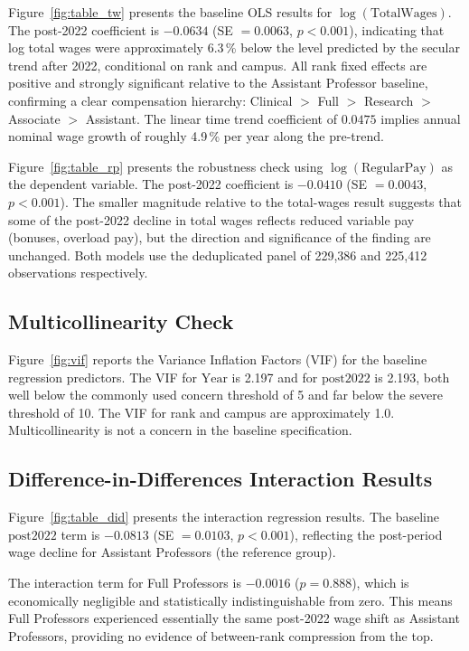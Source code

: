 \documentclass[12pt]{article}
\begin{document}
Figure~\ref{fig:table_tw} presents the
baseline OLS results for $\log(\text{TotalWages})$. The post-2022
coefficient is $-0.0634$ (SE $= 0.0063$, $p < 0.001$), indicating that
log total wages were approximately 6.3\,\% below the level predicted by
the secular trend after 2022, conditional on rank and campus. All rank
fixed effects are positive and strongly significant relative to the
Assistant Professor baseline, confirming a clear compensation hierarchy:
Clinical $>$ Full $>$ Research $>$ Associate $>$ Assistant. The linear
time trend coefficient of $0.0475$ implies annual nominal wage growth of
roughly 4.9\,\% per year along the pre-trend.

Figure~\ref{fig:table_rp} presents the
robustness check using $\log(\text{RegularPay})$ as the dependent
variable. The post-2022 coefficient is $-0.0410$ (SE $= 0.0043$,
$p < 0.001$). The smaller magnitude relative to the total-wages result
suggests that some of the post-2022 decline in total wages reflects
reduced variable pay (bonuses, overload pay), but the direction and
significance of the finding are unchanged. Both models use the
deduplicated panel of 229,386 and 225,412 observations respectively.

\subsection{Multicollinearity Check}
\label{subsec:vif}

Figure~\ref{fig:vif} reports the Variance Inflation Factors (VIF) for
the baseline regression predictors. The VIF for $\text{Year}$ is 2.197
and for $\text{post2022}$ is 2.193, both well below the commonly used
concern threshold of 5 and far below the severe threshold of 10.
The VIF for rank and campus are approximately 1.0. Multicollinearity
is not a concern in the baseline specification.

\subsection{Difference-in-Differences Interaction Results}
\label{subsec:did}

Figure~\ref{fig:table_did} presents the
interaction regression results. The baseline $\text{post2022}$ term
is $-0.0813$ (SE $= 0.0103$, $p < 0.001$), reflecting the post-period
wage decline for Assistant Professors (the reference group).

The interaction term for Full Professors is $-0.0016$ ($p = 0.888$),
which is economically negligible and statistically indistinguishable
from zero. This means Full Professors experienced essentially the same
post-2022 wage shift as Assistant Professors, providing no evidence of
between-rank compression from the top.
\end{document}
